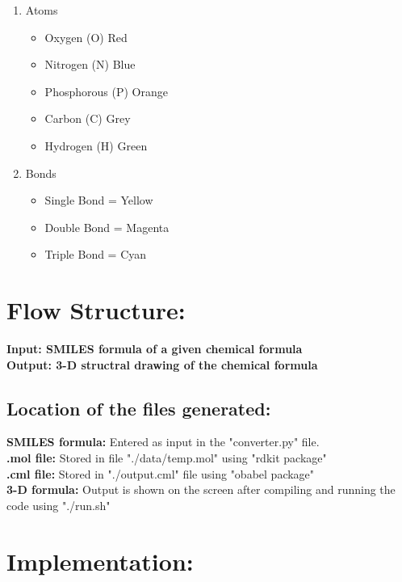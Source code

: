 \documentclass{report}
\begin{document}
\begin{enumerate}
  \item Atoms
  \begin{itemize}
  	\item	Oxygen		(O)		Red
  	\item	Nitrogen		(N)		Blue
  	\item	Phosphorous	(P)		Orange
  	\item	Carbon		(C)		Grey
  	\item	Hydrogen 	(H)		Green
  \end{itemize}
  \item Bonds 
  \begin{itemize}
  	\item	Single Bond 	= Yellow
  	\item	Double Bond 	= Magenta 
  	\item	Triple Bond = Cyan
  \end{itemize}
\end{enumerate}

\section*{Flow Structure:}
\textbf{Input: SMILES formula of a given chemical formula\\
Output: 3-D structral drawing of the chemical formula} \\


\subsection*{Location of the files generated:}
\textbf{SMILES formula:} Entered as input in the "converter.py" file.\\
\textbf{.mol file:} Stored in file "./data/temp.mol" using "rdkit package"\\
\textbf{.cml file:} Stored in "./output.cml" file using "obabel package"\\
\textbf{3-D formula:} Output is shown on the screen after compiling and running the code using "./run.sh"


\section*{Implementation:}
\end{document}
